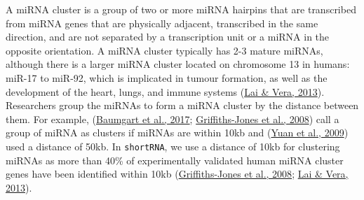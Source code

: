 \documentclass[12pt,twoside]{reedthesis}
\begin{document}
A miRNA cluster is a group of two or more miRNA hairpins that are
transcribed from miRNA genes that are physically adjacent, transcribed
in the same direction, and are not separated by a transcription unit or
a miRNA in the opposite orientation. A miRNA cluster typically has 2-3
mature miRNAs, although there is a larger miRNA cluster located on
chromosome 13 in humans: miR-17 to miR-92, which is implicated in tumour
formation, as well as the development of the heart, lungs, and immune
systems (\protect\hyperlink{ref-lai2013}{Lai \& Vera, 2013}). Researchers group the miRNAs to form a miRNA cluster
by the distance between them. For example, (\protect\hyperlink{ref-baumgart2017}{Baumgart et al., 2017}; \protect\hyperlink{ref-griffiths-jones2008}{Griffiths-Jones et al., 2008}) call a group of miRNA as clusters if miRNAs are within
10kb and (\protect\hyperlink{ref-yuan2009}{Yuan et al., 2009}) used a distance of 50kb. In \texttt{shortRNA}, we use a
distance of 10kb for clustering miRNAs as more than 40\% of
experimentally validated human miRNA cluster genes have been identified
within 10kb (\protect\hyperlink{ref-griffiths-jones2008}{Griffiths-Jones et al., 2008}; \protect\hyperlink{ref-lai2013}{Lai \& Vera, 2013}).
\end{document}
